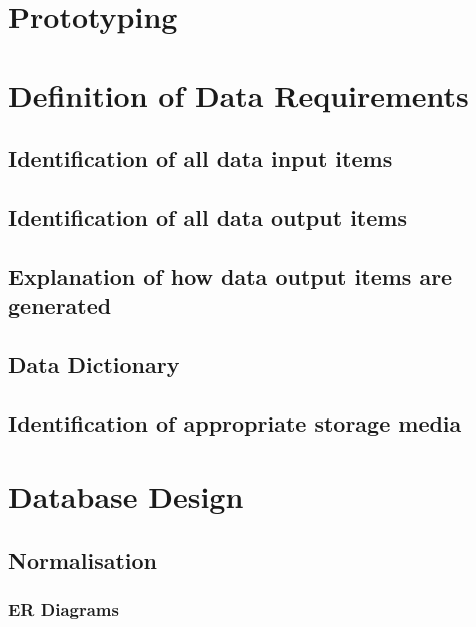 \section{Prototyping}


\section{Definition of Data Requirements}

\subsection{Identification of all data input items}

\subsection{Identification of all data output items}

\subsection{Explanation of how data output items are generated}

\subsection{Data Dictionary}


\subsection{Identification of appropriate storage media}


\section{Database Design}

\subsection{Normalisation}

\subsubsection{ER Diagrams}

